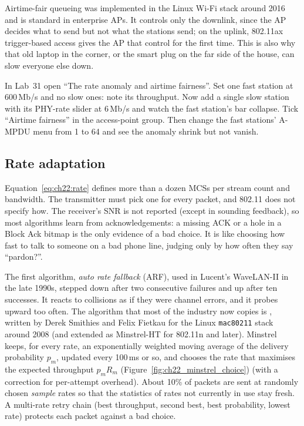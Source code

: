 Airtime-fair queueing was implemented in the Linux Wi-Fi stack around 2016 and is standard in
enterprise APs. It controls only the downlink, since the AP decides what to send but not what the
stations send; on the uplink, 802.11ax trigger-based access gives the AP that control for the first
time. This is also why that old laptop in the corner, or the smart plug on the far side of the
house, can slow everyone else down.

\begin{tryit}
In Lab~31 open ``The rate anomaly and airtime fairness''. Set one fast station at 600\,Mb/s and no
slow ones: note its throughput. Now add a single slow station with its PHY-rate slider at 6\,Mb/s
and watch the fast station's bar collapse. Tick ``Airtime fairness'' in the access-point group. Then
change the fast stations' A-MPDU menu from 1 to 64 and see the anomaly shrink but not vanish.
\end{tryit}

\subsection{Rate adaptation}


Equation~\eqref{eq:ch22:rate} defines more than a dozen MCSs per stream count and bandwidth. The
transmitter must pick one for every packet, and 802.11 does not specify how. The receiver's SNR is
not reported (except in sounding feedback), so most algorithms learn from acknowledgements: a
missing ACK or a hole in a Block Ack bitmap is the only evidence of a bad choice. It is like choosing
how fast to talk to someone on a bad phone line, judging only by how often they say ``pardon?''.

The first algorithm, \emph{auto rate fallback} (ARF), used in Lucent's WaveLAN-II in the late 1990s,
stepped down after two consecutive failures and up after ten successes. It reacts to collisions as
if they were channel errors, and it probes upward too often. The algorithm that most of the industry
now copies is , written by Derek Smithies and Felix Fietkau for the Linux
\texttt{mac80211} stack around 2008 (and extended as Minstrel-HT for 802.11n and later). Minstrel
keeps, for every rate, an exponentially weighted moving average of the delivery probability $p_m$,
updated every 100\,ms or so, and chooses the rate that maximises the expected throughput $p_m R_m$ (Figure~\ref{fig:ch22_minstrel_choice})
(with a correction for per-attempt overhead). About 10\% of packets are sent at randomly chosen
\emph{sample} rates so that the statistics of rates not currently in use stay fresh. A multi-rate
retry chain (best throughput, second best, best probability, lowest rate) protects each packet
against a bad choice.

